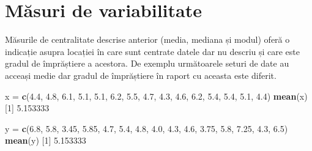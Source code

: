 \documentclass[]{article}
\newenvironment{Shaded}{\begin{snugshade}}{\end{snugshade}}
\newcommand{\KeywordTok}[1]{\textcolor[rgb]{0.13,0.29,0.53}{\textbf{#1}}}
\newcommand{\DecValTok}[1]{\textcolor[rgb]{0.00,0.00,0.81}{#1}}
\newcommand{\FloatTok}[1]{\textcolor[rgb]{0.00,0.00,0.81}{#1}}
\newcommand{\StringTok}[1]{\textcolor[rgb]{0.31,0.60,0.02}{#1}}
\newcommand{\OperatorTok}[1]{\textcolor[rgb]{0.81,0.36,0.00}{\textbf{#1}}}
\newcommand{\NormalTok}[1]{#1}
\begin{document}
\begin{Shaded}
\end{Shaded}

\section{Măsuri de variabilitate}\label{masuri-de-variabilitate}

Măsurile de centralitate descrise anterior (media, mediana și modul)
oferă o indicație asupra locației în care sunt centrate datele dar nu
descriu și care este gradul de împrăștiere a acestora. De exemplu
următoarele seturi de date au acceași medie dar gradul de împrăștiere în
raport cu aceasta este diferit.

\begin{Shaded}
\begin{Highlighting}[]
\NormalTok{x =}\StringTok{ }\KeywordTok{c}\NormalTok{(}\FloatTok{4.4}\NormalTok{, }\FloatTok{4.8}\NormalTok{, }\FloatTok{6.1}\NormalTok{, }\FloatTok{5.1}\NormalTok{, }\FloatTok{5.1}\NormalTok{, }\FloatTok{6.2}\NormalTok{, }\FloatTok{5.5}\NormalTok{, }\FloatTok{4.7}\NormalTok{, }\FloatTok{4.3}\NormalTok{, }
      \FloatTok{4.6}\NormalTok{, }\FloatTok{6.2}\NormalTok{, }\FloatTok{5.4}\NormalTok{, }\FloatTok{5.4}\NormalTok{, }\FloatTok{5.1}\NormalTok{, }\FloatTok{4.4}\NormalTok{)}
\KeywordTok{mean}\NormalTok{(x)}
\NormalTok{[}\DecValTok{1}\NormalTok{] }\FloatTok{5.153333}

\NormalTok{y =}\StringTok{ }\KeywordTok{c}\NormalTok{(}\FloatTok{6.8}\NormalTok{, }\FloatTok{5.8}\NormalTok{, }\FloatTok{3.45}\NormalTok{, }\FloatTok{5.85}\NormalTok{, }\FloatTok{4.7}\NormalTok{, }\FloatTok{5.4}\NormalTok{, }\FloatTok{4.8}\NormalTok{, }\FloatTok{4.0}\NormalTok{, }\FloatTok{4.3}\NormalTok{,}
      \FloatTok{4.6}\NormalTok{, }\FloatTok{3.75}\NormalTok{, }\FloatTok{5.8}\NormalTok{, }\FloatTok{7.25}\NormalTok{, }\FloatTok{4.3}\NormalTok{, }\FloatTok{6.5}\NormalTok{)}
\KeywordTok{mean}\NormalTok{(y)}
\NormalTok{[}\DecValTok{1}\NormalTok{] }\FloatTok{5.153333}
\end{Highlighting}
\end{Shaded}
\end{document}
